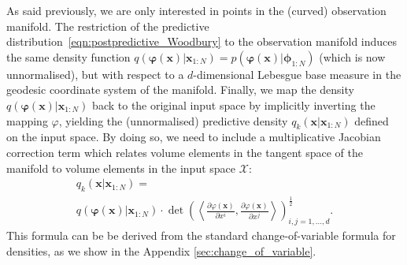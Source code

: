 \documentclass[twoside]{article}
\begin{document}
As said previously, we are only interested in points in the (curved) observation manifold. The restriction of the predictive distribution~\eqref{eqn:postpredictive_Woodbury} to the observation manifold induces the same density function $q(\bm{\varphi}(\bm{x}) \vert \bm{x}_{1:N}) = p(\bm{\varphi}(\bm{x}) \vert\bm{\phi}_{1:N})$ (which is now unnormalised), but with respect to a $d$-dimensional Lebesgue base measure in the geodesic coordinate system of the manifold. Finally, we map the density $q(\bm{\varphi}(\bm{x}) \vert \bm{x}_{1:N})$ back to the original input space by implicitly inverting the mapping $\varphi$, yielding the (unnormalised) predictive density $q_k(\bm{x} \vert \bm{x}_{1:N})$ defined on the input space. By doing so, we need to include a multiplicative Jacobian correction term which relates volume elements in the tangent space of the manifold to volume elements in the input space $\mathcal{X}$:
\begin{multline} \label{corrected_density}
q_k(\bm{x} \vert \bm{x}_{1:N}) = \\
q(\bm{\varphi}(\bm{x})\vert\bm{x}_{1:N}) \cdot \det\left( \left\langle\frac{\partial\varphi(\bm{x})}{\partial x^i} ,  \frac{\partial\varphi(\bm{x})}{\partial x^j}\right\rangle \right)^{\frac{1}{2}}_{i,j=1,\ldots, d} .
\end{multline}
This formula can be be derived from the standard change-of-variable formula for densities, as we show in the Appendix \ref{sec:change_of_variable}.
\end{document}
